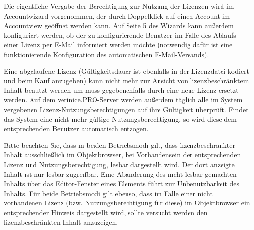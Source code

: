 \documentclass[a4paper,10pt]{book}
\begin{document}
Die eigentliche Vergabe der Berechtigung zur Nutzung der Lizenzen wird im Accountwizard vorgenommen, der durch Doppelklick auf einen Account im Accountview geöffnet werden kann. Auf Seite 5 des Wizards kann außerdem konfiguriert werden, ob der zu konfigurierende Benutzer im Falle des Ablaufs einer Lizenz per E-Mail informiert werden möchte (notwendig dafür ist eine funktionierende Konfiguration des automatischen E-Mail-Versands).

Eine abgelaufene Lizenz (Gültigkeitsdauer ist ebenfalls in der Lizenzdatei kodiert und beim Kauf anzugeben) kann nicht mehr zur Ansicht von lizenzbeschränktem Inhalt benutzt werden um muss gegebenenfalls durch eine neue Lizenz ersetzt werden. Auf dem verinice.PRO-Server werden außerdem täglich alle im System vergebenen Lizenz-Nutzungsberechtigungen auf ihre Gültigkeit überprüft. Findet das System eine nicht mehr gültige Nutzungsberechtigung, so wird diese dem entsprechenden Benutzer automatisch entzogen.

Bitte beachten Sie, dass in beiden Betriebsmodi gilt, dass lizenzbeschränkter Inhalt ausschließlich im Objektbrowser, bei Vorhandensein der entsprechenden Lizenz und Nutzungsberechtigung, lesbar dargestellt wird. Der dort anzeigte Inhalt ist nur lesbar zugreifbar. Eine Abänderung des nicht lesbar gemachten Inhalts über das Editor-Fenster eines Elements führt zur Unbenutzbarkeit des Inhalts. Für beide Betriebsmodi gilt ebenso, dass im Falle einer nicht vorhandenen Lizenz (bzw. Nutzungsberechtigung für diese) im Objektbrowser ein entsprechender Hinweis dargestellt wird, sollte versucht werden den lizenzbeschränkten Inhalt anzuzeigen.
\end{document}
